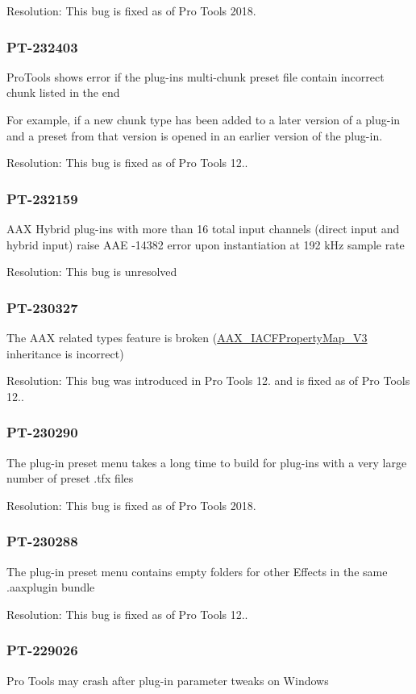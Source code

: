 Resolution\+: This bug is fixed as of Pro Tools 2018.\hypertarget{a00846_PT-232403}{}\subsubsection{P\+T-\/232403}\label{a00846_PT-232403}
Pro\+Tools shows error if the plug-\/in\textquotesingle{}s multi-\/chunk preset file contain incorrect chunk listed in the end

For example, if a new chunk type has been added to a later version of a plug-\/in and a preset from that version is opened in an earlier version of the plug-\/in.

Resolution\+: This bug is fixed as of Pro Tools 12..\hypertarget{a00846_PT-232159}{}\subsubsection{P\+T-\/232159}\label{a00846_PT-232159}
A\+AX Hybrid plug-\/ins with more than 16 total input channels (direct input and hybrid input) raise A\+AE -\/14382 error upon instantiation at 192 k\+Hz sample rate

Resolution\+: This bug is unresolved\hypertarget{a00846_PT-230327}{}\subsubsection{P\+T-\/230327}\label{a00846_PT-230327}
The A\+AX related types feature is broken (\mbox{\hyperlink{a01753}{A\+A\+X\+\_\+\+I\+A\+C\+F\+Property\+Map\+\_\+\+V3}} inheritance is incorrect)

Resolution\+: This bug was introduced in Pro Tools 12. and is fixed as of Pro Tools 12..\hypertarget{a00846_PT-230290}{}\subsubsection{P\+T-\/230290}\label{a00846_PT-230290}
The plug-\/in preset menu takes a long time to build for plug-\/ins with a very large number of preset .tfx files

Resolution\+: This bug is fixed as of Pro Tools 2018.\hypertarget{a00846_PT-230288}{}\subsubsection{P\+T-\/230288}\label{a00846_PT-230288}
The plug-\/in preset menu contains empty folders for other Effects in the same .aaxplugin bundle

Resolution\+: This bug is fixed as of Pro Tools 12..\hypertarget{a00846_PT-229026}{}\subsubsection{P\+T-\/229026}\label{a00846_PT-229026}
Pro Tools may crash after plug-\/in parameter tweaks on Windows

